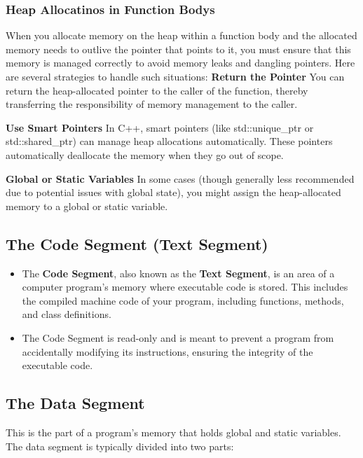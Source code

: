 \documentclass{report}
\begin{document}
    \pagebreak 
    \subsubsection{Heap Allocatinos in Function Bodys}
    \bigbreak \noindent 
    When you allocate memory on the heap within a function body and the allocated memory needs to outlive the pointer that points to it, you must ensure that this memory is managed correctly to avoid memory leaks and dangling pointers. Here are several strategies to handle such situations:
    \bigbreak \noindent 
    \textbf{Return the Pointer}
    \bigbreak \noindent 
    You can return the heap-allocated pointer to the caller of the function, thereby transferring the responsibility of memory management to the caller.

    \bigbreak \noindent 
    \textbf{Use Smart Pointers}
    \bigbreak \noindent 
    In C++, smart pointers (like std::unique\_ptr or std::shared\_ptr) can manage heap allocations automatically. These pointers automatically deallocate the memory when they go out of scope.

    \bigbreak \noindent 
    \textbf{Global or Static Variables}
    \bigbreak \noindent 
    In some cases (though generally less recommended due to potential issues with global state), you might assign the heap-allocated memory to a global or static variable.

    \bigbreak \noindent 
    \subsection{The Code Segment (Text Segment)}
    \bigbreak \noindent 
    \begin{itemize}
        \item The \textbf{Code Segment}, also known as the \textbf{Text Segment}, is an area of a computer program's memory where executable code is stored. This includes the compiled machine code of your program, including functions, methods, and class definitions.
        \item The Code Segment is read-only and is meant to prevent a program from accidentally modifying its instructions, ensuring the integrity of the executable code.
    \end{itemize}

    \bigbreak \noindent 
    \subsection{The Data Segment}
    \bigbreak \noindent 
    This is the part of a program's memory that holds global and static variables. The data segment is typically divided into two parts:
    \bigbreak \noindent 
\end{document}
